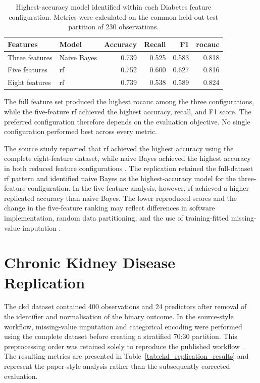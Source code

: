 \begin{table}[htbp]
    \centering
    \small
    \caption{Highest-accuracy model identified within each Diabetes feature configuration. Metrics were calculated on the common held-out test partition of 230 observations.}
    \label{tab:diabetes_best_results}
    \begin{tabular}{@{}llrrrr@{}}
        \toprule
        \textbf{Features} & \textbf{Model} & \textbf{Accuracy} & \textbf{Recall} & \textbf{F1} & \textbf{\gls{rocauc}} \\
        \midrule
        Three features & Naive Bayes & 0.739 & 0.525 & 0.583 & 0.818 \\
        Five features & \Gls{rf} & 0.752 & 0.600 & 0.627 & 0.816 \\
        Eight features & \Gls{rf} & 0.739 & 0.538 & 0.589 & 0.824 \\
        \bottomrule
    \end{tabular}
\end{table}

The full feature set produced the highest \gls{rocauc} among the three configurations, while the five-feature \gls{rf} achieved the highest accuracy, recall, and F1 score. The preferred configuration therefore depends on the evaluation objective. No single configuration performed best across every metric.

The source study reported that \gls{rf} achieved the highest accuracy using the complete eight-feature dataset, while naive Bayes achieved the highest accuracy in both reduced feature configurations \citep{chang_pima_2023}. The replication retained the full-dataset \gls{rf} pattern and identified naive Bayes as the highest-accuracy model for the three-feature configuration. In the five-feature analysis, however, \gls{rf} achieved a higher replicated accuracy than naive Bayes. The lower reproduced scores and the change in the five-feature ranking may reflect differences in software implementation, random data partitioning, and the use of training-fitted missing-value imputation \citep{collins_tripodai_2024, moons_probastai_2025}.

\section{Chronic Kidney Disease Replication}

The \gls{ckd} dataset contained 400 observations and 24 predictors after removal of the identifier and normalisation of the binary outcome. In the source-style workflow, missing-value imputation and categorical encoding were performed using the complete dataset before creating a stratified 70:30 partition. This preprocessing order was retained solely to reproduce the published workflow \citep{santhiya_chronic_2024}. The resulting metrics are presented in Table~\ref{tab:ckd_replication_results} and represent the paper-style analysis rather than the subsequently corrected evaluation.

